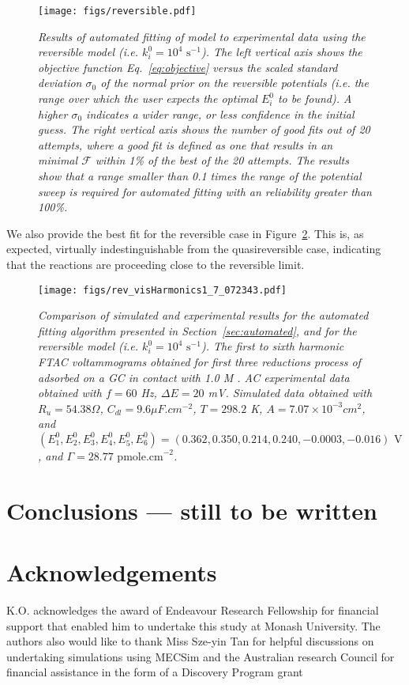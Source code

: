 \documentclass[a4paper, 12pt]{article}
\begin{document}
\begin{figure}[htbp]
\texttt{[image: figs/reversible.pdf]}
    \caption{\it{Results of automated fitting of model to experimental data
    using the reversible model (i.e. $k^0_i = 10^{4}\text{ s}^{-1}$). The left
    vertical axis shows the objective function Eq.~\ref{eq:objective} versus the
    scaled standard deviation $\sigma_0$ of the normal prior on the reversible
    potentials (i.e. the range over which the user expects the optimal $E^0_i$
    to be found). A higher $\sigma_0$ indicates a wider range, or less
    confidence in the initial guess. The right vertical axis shows the number of
    good fits out of 20 attempts, where a good fit is defined as one that
    results in an minimal $\mathcal{F}$ within 1\% of the best of the 20
    attempts. The results show that a range smaller than 0.1 times the range of
    the potential sweep is required for automated fitting with an reliability 
    greater than 100\%.}}
    \label{fig:rev_results}
\end{figure}

We also provide the best fit for the reversible case in
Figure~\ref{fig:rev_best_result}. This is, as expected, virtually
indestinguishable from the quasireversible case, indicating that the reactions
are proceeding close to the reversible limit.

\begin{figure}[htbp]
\texttt{[image: figs/rev\_visHarmonics1\_7\_072343.pdf]}
    \caption{\it{Comparison of simulated and experimental results for the
    automated fitting algorithm presented in Section~\ref{sec:automated}, and
    for the reversible model (i.e. $k^0_i = 10^{4}\text{ s}^{-1}$). The first to
    sixth harmonic FTAC voltammograms obtained for first three reductions
    process of  adsorbed on a GC in contact with 1.0 M
    . AC experimental data obtained with $f = 60$ Hz, $\Delta E = 20$
    mV. Simulated data obtained with $R_u = 54.38 \Omega$, $C_{dl} = 9.6 \mu
    F.cm^{-2}$, $T = 298.2$ K, $A = 7.07 \times 10^{-3} cm^2$, and
    $(E^0_1,E^0_2,E^0_3,E^0_4,E^0_5,E^0_6) = (0.362, 0.350, 0.214, 0.240, -0.0003,
    -0.016)\text{ V}$, and $\Gamma = 28.77\text{ pmole.cm}^{-2}$.}}
    \label{fig:rev_best_result}
\end{figure}

\section{Conclusions --- still to be written}

\section{Acknowledgements}

K.O. acknowledges the award of Endeavour Research Fellowship for financial
support that enabled him to undertake this study at Monash University. The
authors also would like to thank Miss Sze-yin Tan for helpful discussions on
undertaking simulations using MECSim and the Australian research Council for
financial assistance in the form of a Discovery Program grant



\end{document}
